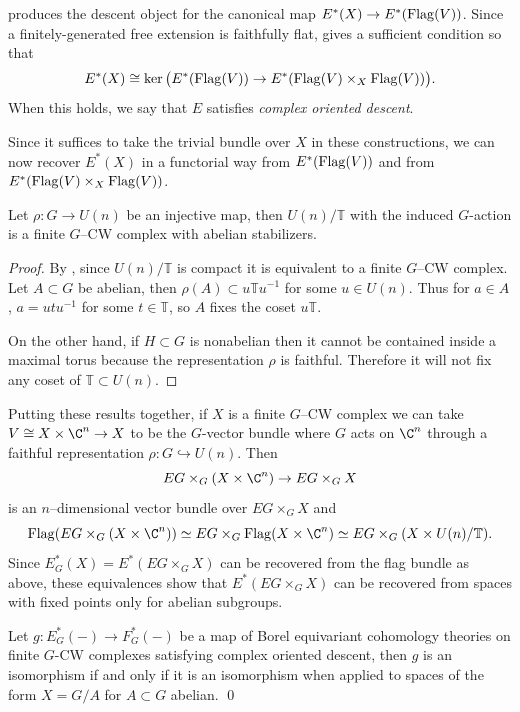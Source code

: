 produces the descent object for the canonical map \(E^*(X) \rightarrow E^*(\operatorname{Flag}(V))\).
Since a finitely-generated free extension is faithfully flat,  gives a sufficient condition so that
\begin{equation*}
E^*(X) \cong \ker \big (E^*(\operatorname{Flag}(V)) \rightarrow E^*(\operatorname{Flag}(V) \times_X \operatorname{Flag}(V)) \big ).
\end{equation*}
When this holds, we say that \(E\) satisfies \textit{complex oriented descent}.

Since it suffices to take the trivial bundle over \(X\) in these constructions, we can now recover \(E^*(X)\) in a functorial way from \(E^*(\operatorname{Flag}(V))\) and from \(E^*(\operatorname{Flag}(V) \times_X \operatorname{Flag}(V))\).

\begin{proposition}
Let \(\rho \colon G \rightarrow U(n)\) be an injective map, then \(U(n)/\mathbb{T}\) with the induced \(G\)-action is a finite \(G\)--CW complex with abelian stabilizers.
\end{proposition}
\begin{proof}
By , since \(U(n)/\mathbb{T}\) is compact it is equivalent to a finite \(G\)--CW complex.
Let \(A \subset G\) be abelian, then \(\rho(A) \subset u\mathbb{T}u^{-1}\) for some \(u \in U(n)\).
Thus for \(a \in A\), \(a = utu^{-1}\) for some \(t \in \mathbb{T}\), so \(A\) fixes the coset \(u\mathbb{T}\).

On the other hand, if \(H \subset G\) is nonabelian then it cannot be contained inside a maximal
torus because the representation \(\rho\) is faithful.
Therefore it will not fix any coset of \(\mathbb{T} \subset U(n)\).
\end{proof}

Putting these results together, if \(X\) is a finite \(G\)--CW complex we can take \(V \cong X \times \C^n \rightarrow X\) to be the \(G\)-vector bundle where \(G\) acts on \(\C^n\) through a faithful representation \(\rho \colon G \hookrightarrow U(n)\).
Then 
\[
EG \times_G (X \times \C^n) \rightarrow EG \times_G X
\]
is an \(n\)--dimensional vector bundle over \(EG \times_G X\) and
\[
\Flag(EG \times_G (X \times \C^n)) \simeq EG \times_G \Flag(X \times \C^n) \simeq EG \times_G (X \times U(n)/\mathbb{T}).
\]
Since \(E^{*}_{G}(X) = E^*(EG \times_G X)\) can be recovered from the flag bundle as above, these equivalences show that \(E^*(EG \times_G X)\) can be recovered from spaces with fixed points only for abelian subgroups. 

\begin{proposition} \label{app:codescent}
Let \(g \colon E_{G}^*(-) \rightarrow F_{G}^*(-)\) be a map of Borel equivariant cohomology theories on finite \(G\)-CW complexes satisfying complex oriented descent, then \(g\) is an isomorphism if and only if it is an isomorphism when applied to spaces of the form \(X = G/A\) for \(A \subset G\) abelian.
\qed
\end{proposition}

